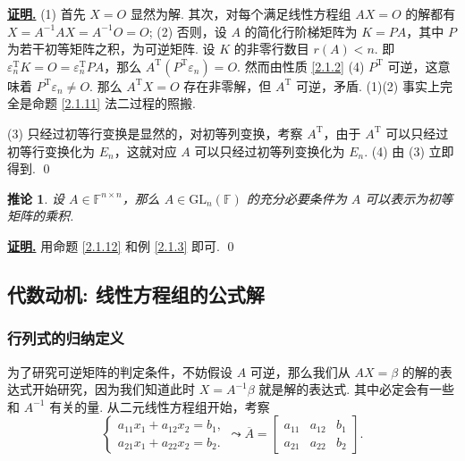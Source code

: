\documentclass[10pt,openany]{article}
\theoremstyle{thmstyle} %
\theoremstyle{defstyle} %
\newtheorem{corollary}[theorem]{推论}
\theoremstyle{prostyle} %
\theoremstyle{exastyle}
\theoremstyle{remstyle}
\renewenvironment{proof}[1][证明]{\par\underline{\textbf{#1.}} \;\fangsong}{\qed\par}
\newcommand{\T}{^{\text{T}}}
\newcommand{\F}{\mathbb{F}}
\newcommand{\gf}{\text{GL}_n(\mathbb{F})}
\newcommand{\n}{^{n \times n}}
\begin{document}
\begin{proof}
	(1) 首先 \( X=O \) 显然为解. 其次，对每个满足线性方程组 \( AX=O \) 的解都有 \( X=A^{-1}AX=A^{-1}O=O \);
	(2) 否则，设 \( A \) 的简化行阶梯矩阵为 \( K=PA \)，其中 \( P \) 为若干初等矩阵之积，为可逆矩阵. 设 \( K \) 的非零行数目 \( r(A)<n \). 即 \( \varepsilon_n\T K=O= \varepsilon_n\T PA \)，那么 \( A\T(P\T \varepsilon_n)=O \). 然而由性质 \ref{2.1.2} (4) \( P\T \) 可逆，这意味着 \( P\T \varepsilon_n \neq O \). 那么 \( A\T X=O \) 存在非零解，但 \( A\T \) 可逆，矛盾. (1)(2) 事实上完全是命题 \ref{2.1.11} 法二过程的照搬.
	
	\vspace{1ex}
	
    (3) 只经过初等行变换是显然的，对初等列变换，考察 \( A\T \)，由于 \( A\T \) 可以只经过初等行变换化为 \( E_n \)，这就对应 \( A \) 可以只经过初等列变换化为 \( E_n \). (4) 由 (3) 立即得到.
\end{proof}

\begin{corollary}	\label{2.1.13}
	设 \( A \in \F\n \)，那么 \( A \in \gf \) 的充分必要条件为 \( A \) 可以表示为初等矩阵的乘积.

\end{corollary}

\begin{proof}
	用命题 \ref{2.1.12} 和例 \ref{2.1.3} 即可.
\end{proof}

\subsection{代数动机: 线性方程组的公式解}

\subsubsection{行列式的归纳定义}
为了研究可逆矩阵的判定条件，不妨假设 \( A \) 可逆，那么我们从 \( AX=\beta \) 的解的表达式开始研究，因为我们知道此时 \( X=A^{-1}\beta \) 就是解的表达式. 其中必定会有一些和 \( A^{-1} \) 有关的量. 从二元线性方程组开始，考察
\[ \left\{ \begin{array}{l}
	a_{11}x_1+a_{12}x_2=b_1, \\
	a_{21}x_1+a_{22}x_2=b_2.
\end{array}\right. \leadsto \overline{A}=\begin{bmatrix}
 a_{11} & a_{12} & b_1 \\
 a_{21} & a_{22} & b_2
\end{bmatrix}. \]
\end{document}
